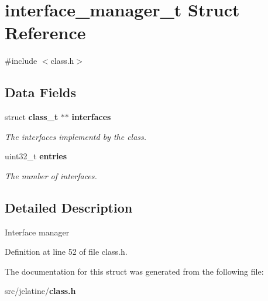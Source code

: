 \section{interface\_\-manager\_\-t Struct Reference}
\label{structinterface__manager__t}


{\ttfamily \#include $<$class.h$>$}

\subsection*{Data Fields}
\begin{DoxyCompactItemize}
\item 
struct {\bf class\_\-t} $\ast$$\ast$ {\bf interfaces}\label{structinterface__manager__t_a91f9abcf42c2acb6da515afc231bcdcd}

\begin{DoxyCompactList}\small\item\em The interfaces implementd by the class. \item\end{DoxyCompactList}\item 
uint32\_\-t {\bf entries}\label{structinterface__manager__t_a638bfd4f9d42b4ebf31d6c83d92cc313}

\begin{DoxyCompactList}\small\item\em The number of interfaces. \item\end{DoxyCompactList}\end{DoxyCompactItemize}


\subsection{Detailed Description}
Interface manager 

Definition at line 52 of file class.h.



The documentation for this struct was generated from the following file:\begin{DoxyCompactItemize}
\item 
src/jelatine/{\bf class.h}\end{DoxyCompactItemize}
